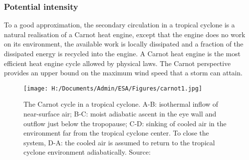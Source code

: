 \subsubsection{Potential intensity}

To a good approximation, the secondary circulation in a tropical cyclone is a natural realisation of a Carnot heat engine, except that the engine does no work on its environment, the available work is locally dissipated and a fraction of the dissipated energy is recycled into the engine. A Carnot heat engine is the most efficient heat engine cycle allowed by physical laws. The Carnot perspective provides an upper bound on the maximum wind speed that a storm can attain.

\begin{figure}[h]
	\centering
	\noindent\texttt{[image: H:/Documents/Admin/ESA/Figures/carnot1.jpg]}
	\caption{The Carnot cycle in a tropical cyclone. A-B: isothermal inflow of near-surface air; B-C: moist adiabatic ascent in the eye wall and outflow just below the tropopause; C-D: sinking of cooled air in the environment far from the tropical cyclone center. To close the system, D-A: the cooled air is assumed to return to the tropical cyclone environment adiabatically. Source:\cite{goescarnot}}\label{fig:cyclone_carnot}
\end{figure}






